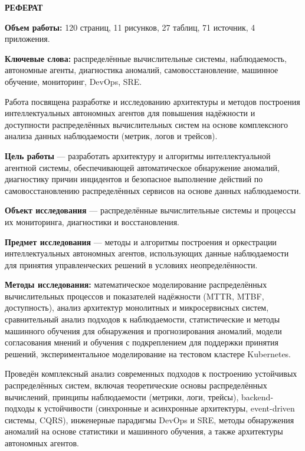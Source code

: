 \begin{center}
    \textbf{РЕФЕРАТ}
\end{center}

\vspace{1cm}

\textbf{Объем работы:} 120 страниц, 11 рисунков, 27 таблиц, 71 источник, 4 приложения.

\textbf{Ключевые слова:} распределённые вычислительные системы, наблюдаемость, автономные агенты, диагностика аномалий, самовосстановление, машинное обучение, мониторинг, DevOps, SRE.

\vspace{1cm}

Работа посвящена разработке и исследованию архитектуры и методов построения интеллектуальных автономных агентов для повышения надёжности и доступности распределённых вычислительных систем на основе комплексного анализа данных наблюдаемости (метрик, логов и трейсов).

\textbf{Цель работы} — разработать архитектуру и алгоритмы интеллектуальной агентной системы, обеспечивающей автоматическое обнаружение аномалий, диагностику причин инцидентов и безопасное выполнение действий по самовосстановлению распределённых сервисов на основе данных наблюдаемости.

\textbf{Объект исследования} — распределённые вычислительные системы и процессы их мониторинга, диагностики и восстановления.

\textbf{Предмет исследования} — методы и алгоритмы построения и оркестрации интеллектуальных автономных агентов, использующих данные наблюдаемости для принятия управленческих решений в условиях неопределённости.

\textbf{Методы исследования:} математическое моделирование распределённых вычислительных процессов и показателей надёжности (MTTR, MTBF, доступность), анализ архитектур монолитных и микросервисных систем, сравнительный анализ подходов к наблюдаемости, статистические и методы машинного обучения для обнаружения и прогнозирования аномалий, модели согласования мнений и обучения с подкреплением для поддержки принятия решений, экспериментальное моделирование на тестовом кластере Kubernetes.

Проведён комплексный анализ современных подходов к построению устойчивых распределённых систем, включая теоретические основы распределённых вычислений, принципы наблюдаемости (метрики, логи, трейсы), backend-подходы к устойчивости (синхронные и асинхронные архитектуры, event-driven системы, CQRS), инженерные парадигмы DevOps и SRE, методы обнаружения аномалий на основе статистики и машинного обучения, а также архитектуры автономных агентов.

